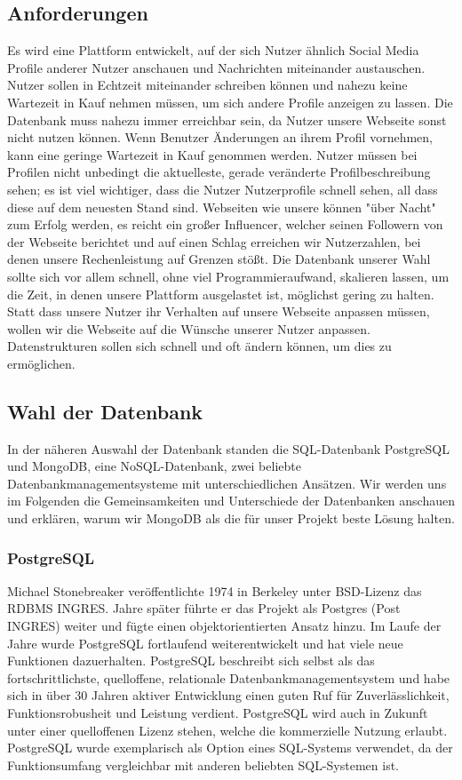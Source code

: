 \subsection{Anforderungen}
Es wird eine Plattform entwickelt, auf der sich Nutzer ähnlich Social Media Profile anderer Nutzer anschauen und Nachrichten miteinander austauschen. Nutzer sollen in Echtzeit miteinander schreiben können und nahezu keine Wartezeit in Kauf nehmen müssen, um sich andere Profile anzeigen zu lassen. Die Datenbank muss nahezu immer erreichbar sein, da Nutzer unsere Webseite sonst nicht nutzen können. 
Wenn Benutzer Änderungen an ihrem Profil vornehmen, kann eine geringe Wartezeit in Kauf genommen werden. Nutzer müssen bei Profilen nicht unbedingt die aktuelleste, gerade veränderte Profilbeschreibung sehen; es ist viel wichtiger, dass die Nutzer Nutzerprofile schnell sehen, all dass diese auf dem neuesten Stand sind. 
Webseiten wie unsere können "über Nacht" zum Erfolg werden, es reicht ein großer Influencer, welcher seinen Followern von der Webseite berichtet und auf einen Schlag erreichen wir Nutzerzahlen, bei denen unsere Rechenleistung auf Grenzen stößt. Die Datenbank unserer Wahl sollte sich vor allem schnell, ohne viel Programmieraufwand, skalieren lassen, um die Zeit, in denen unsere Plattform ausgelastet ist, möglichst gering zu halten. 
Statt dass unsere Nutzer ihr Verhalten auf unsere Webseite anpassen müssen, wollen wir die Webseite auf die Wünsche unserer Nutzer anpassen. Datenstrukturen sollen sich schnell und oft ändern können, um dies zu ermöglichen.

\subsection{Wahl der Datenbank}
In der näheren Auswahl der Datenbank standen die SQL-Datenbank PostgreSQL und MongoDB, eine NoSQL-Datenbank, zwei beliebte Datenbankmanagementsysteme mit unterschiedlichen Ansätzen. Wir werden uns im Folgenden die Gemeinsamkeiten und Unterschiede der Datenbanken anschauen und erklären, warum wir MongoDB als die für unser Projekt beste Lösung halten.

\subsubsection{PostgreSQL}
Michael Stonebreaker veröffentlichte 1974 in Berkeley unter BSD-Lizenz das RDBMS INGRES. Jahre später führte er das Projekt als Postgres (Post INGRES) weiter und fügte einen objektorientierten Ansatz hinzu. \cite{PG1} Im Laufe der Jahre wurde PostgreSQL fortlaufend weiterentwickelt und hat viele neue Funktionen dazuerhalten.
PostgreSQL beschreibt sich selbst als das fortschrittlichste, quelloffene, relationale Datenbankmanagementsystem und habe sich in über 30 Jahren aktiver Entwicklung einen guten Ruf für Zuverlässlichkeit, Funktionsrobusheit und Leistung verdient. \cite{PG2} PostgreSQL wird auch in Zukunft unter einer quelloffenen Lizenz stehen, welche die kommerzielle Nutzung erlaubt. \cite{PG3}
PostgreSQL wurde exemplarisch als Option eines SQL-Systems verwendet, da der Funktionsumfang vergleichbar mit anderen beliebten SQL-Systemen ist. \cite{PG4}

